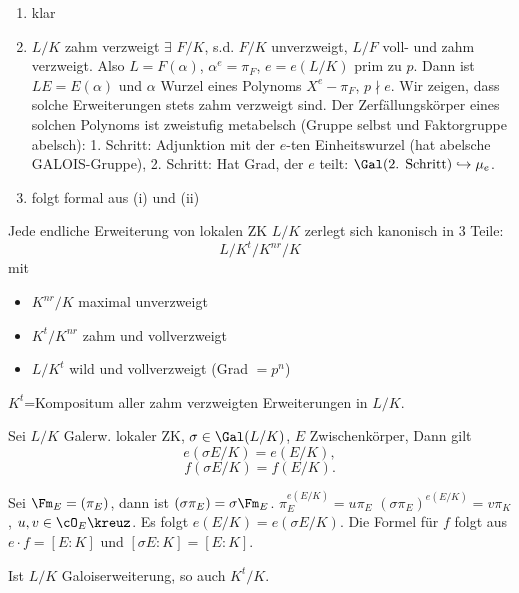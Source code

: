 \begin{Beweis}
 \begin{enumerate}
  \item klar
  \item $L/K$ zahm verzweigt \folge $\exists$ $F/K$, s.d. $F/K$ unverzweigt, $L/F$ voll- und zahm verzweigt. Also $L=F(\alpha)$, $\alpha^e=\pi_F$, $e=e(L/K)$ prim zu $p$. Dann ist $LE=E(\alpha)$ und $\alpha$ Wurzel eines Polynoms $X^e-\pi_F$, $p\nmid e$. Wir zeigen, dass solche Erweiterungen stets zahm verzweigt sind. Der Zerfällungskörper eines solchen Polynoms ist zweistufig metabelsch (Gruppe selbst und Faktorgruppe abelsch): 1. Schritt: Adjunktion mit der $e$-ten Einheitswurzel (hat abelsche GALOIS-Gruppe), 2. Schritt: Hat Grad, der $e$ teilt: $\Gal(\text{2. Schritt})\hookrightarrow \mu_e$. 
  \item folgt formal aus (i) und (ii)
 \end{enumerate}
\end{Beweis}

\begin{Folgerung}
 Jede endliche Erweiterung von lokalen ZK $L/K$ zerlegt sich kanonisch in 3 Teile: \[ L/K^t/K^{nr}/K\]
 mit \begin{itemize}
      \item $K^{nr}/K$ maximal unverzweigt
      \item $K^t/K^{nr}$ zahm und vollverzweigt
      \item $L/K^t$ wild und vollverzweigt (Grad $=p^n$)
     \end{itemize}
\end{Folgerung}

\begin{Beweis}
 $K^t$=Kompositum aller zahm verzweigten Erweiterungen in $L/K$.
\end{Beweis}

\begin{Lemma}
 Sei $L/K$ Galerw. lokaler ZK, $\sigma\in\Gal(L/K)$, $E$ Zwischenkörper, Dann gilt \[ e(\sigma E/K)=e(E/K),\] \[f(\sigma E/K)=f(E/K). \]
\end{Lemma}

\begin{Beweis}
 Sei $\Fm_E=(\pi_E)$, dann ist $(\sigma \pi_E)=\sigma\Fm_E$. $\pi_E^{e(E/K)}=u \pi_E$ \folge $(\sigma \pi_E)^{e(E/K)}=v\pi_K$, $u,v\in\cO_E\kreuz$. Es folgt $e(E/K)=e(\sigma E/K)$. Die Formel für $f$ folgt aus $e\cdot f=[E:K]$ und $[\sigma E:K]=[E:K]$.
\end{Beweis}

\begin{Folgerung}
 Ist $L/K$ Galoiserweiterung, so auch $K^t/K$.
\end{Folgerung}

